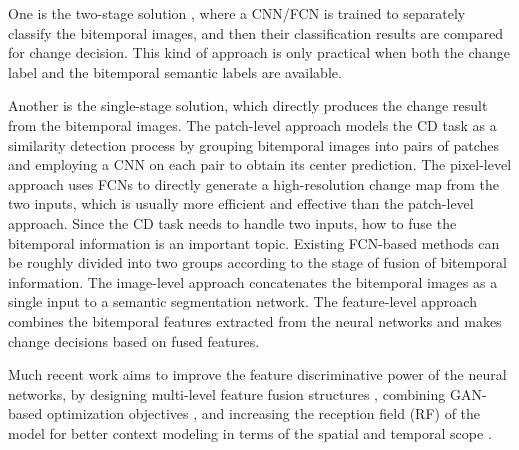 \documentclass[journal]{IEEEtran}
\begin{document}
One is the two-stage solution \cite{Nemoto2017, Ji2019, Liu2019a}, where a CNN/FCN is trained to separately classify the bitemporal images, and then their classification results are compared for change decision. This kind of approach is only practical when both the change label and the bitemporal semantic labels are available. 

Another is the single-stage solution, which directly produces the change result from the bitemporal images. The patch-level approach \cite{Daudt2018a, Rahman2018, Wang2020} models the CD task as a similarity detection process by grouping bitemporal images into pairs of patches and employing a CNN on each pair to obtain its center prediction. The pixel-level approach \cite{Daudt2018, Lebedev2018, Peng2019, Bem2020, Liu2019b, Jiang2020, Zhang2020b, Bao2020, Hou2020, Zhan2017, Fang2019, Zhang2019c, Chen2020, Chen2020e, Diakogiannis2020, Peng2020a} uses FCNs to directly generate a high-resolution change map from the two inputs, which is usually more efficient and effective than the patch-level approach. Since the CD task needs to handle two inputs, how to fuse the bitemporal information is an important topic. Existing FCN-based methods can be roughly divided into two groups according to the stage of fusion of bitemporal information. The image-level approach \cite{Daudt2018, Lebedev2018, Peng2019, Bem2020, Zhao2020c} concatenates the bitemporal images as a single input to a semantic segmentation network. The feature-level approach \cite{Daudt2018, Liu2019b, Jiang2020, Zhang2020b, Bao2020, Hou2020, Zhan2017, Fang2019, Zhang2019c, Chen2020, Chen2020e, Peng2020a, Chen2021a} combines the bitemporal features extracted from the neural networks and makes change decisions based on fused features. 

Much recent work aims to improve the feature discriminative power of the neural networks, by designing multi-level feature fusion structures \cite{Zhang2020b, Liu2019b, Jiang2020, Chen2020e, Hou2020, Chen2021a}, combining GAN-based optimization objectives \cite{Lebedev2018, Zhao2020b, Hou2020, Fang2019}, and increasing the reception field (RF) of the model for better context modeling in terms of the spatial and temporal scope \cite{Chen2020, Chen2020e, Zhang2019c, Zhang2020a, Liu2019b, Zhang2020b, Peng2020a, Jiang2020, Diakogiannis2020}. 
\end{document}
